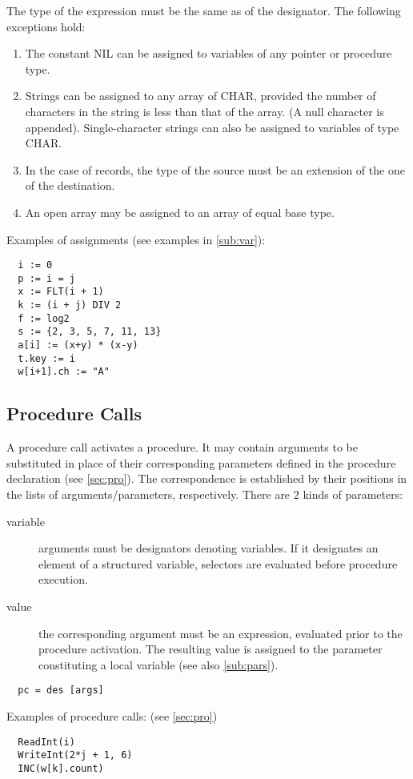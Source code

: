 The type of the expression must be the same as of the designator. The following exceptions hold:
\begin{enumerate}
  \item The constant NIL can be assigned to variables of any pointer or procedure type.
  \item Strings can be assigned to any array of CHAR, provided the number of characters in
    the string is less than that of the array. (A null character is appended).
    Single-character strings can also be assigned to variables of type CHAR.
  \item In the case of records, the type of the source must be an extension of the one of
    the destination.
  \item An open array may be assigned to an array of equal base type.
\end{enumerate}

Examples of assignments (see examples in \ref{sub:var}):
\begin{verbatim}
  i := 0
  p := i = j
  x := FLT(i + 1)
  k := (i + j) DIV 2
  f := log2
  s := {2, 3, 5, 7, 11, 13}
  a[i] := (x+y) * (x-y)
  t.key := i
  w[i+1].ch := "A"
\end{verbatim}

\subsection{Procedure Calls}
A procedure call activates a procedure. It may contain arguments to be substituted in place
of their corresponding parameters defined in the procedure declaration (see \ref{sec:pro}).
The correspondence is established by their positions in the lists of arguments/parameters,
respectively. There are 2 kinds of parameters:
\begin{description}
  \item[variable] arguments must be designators denoting variables. If it designates an
    element of a structured variable, selectors are evaluated before procedure execution.
  \item[value] the corresponding argument must be an expression, evaluated prior to the
    procedure activation. The resulting value is assigned to the parameter constituting
    a local variable (see also \ref{sub:pars}).
\end{description}
\begin{verbatim}
  pc = des [args]
\end{verbatim}
Examples of procedure calls: (see \ref{sec:pro})
\begin{verbatim}
  ReadInt(i)
  WriteInt(2*j + 1, 6)
  INC(w[k].count)
\end{verbatim}

